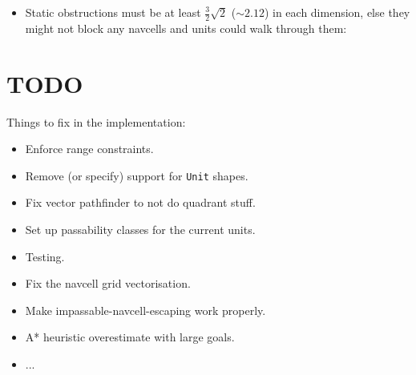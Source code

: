 \documentclass[a4paper,10pt]{article}
\begin{document}
\begin{itemize}
\item Static obstructions must be at least $\frac{3}{2}\sqrt{2}$ ($\sim2.12$)
in each dimension, else they might not block any navcells and units could
walk through them:


\end{itemize}

\section{TODO}

Things to fix in the implementation:
\begin{itemize}
 \item Enforce range constraints.
 \item Remove (or specify) support for \texttt{Unit} shapes.
 \item Fix vector pathfinder to not do quadrant stuff.
 \item Set up passability classes for the current units.
 \item Testing.
 \item Fix the navcell grid vectorisation.
 \item Make impassable-navcell-escaping work properly.
 \item A* heuristic overestimate with large goals.
 \item ...
\end{itemize}
\end{document}

